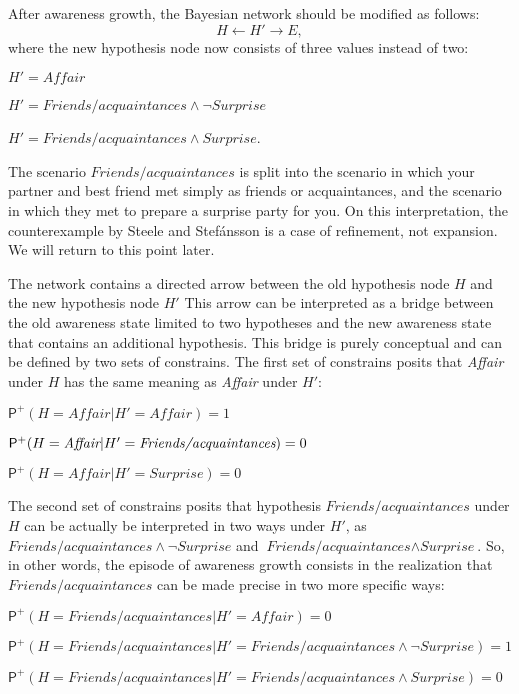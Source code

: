 \documentclass[
  11pt,
  dvipsnames,enabledeprecatedfontcommands]{scrartcl}
\newcommand{\ppr}[2]{\ensuremath{\mathsf{P}^{#1}(#2)}}
\begin{document}
After awareness growth, the Bayesian network should be modified as
follows: \[H \leftarrow H' \rightarrow E,\] where the new hypothesis
node now consists of three values instead of two:

\(H'=\textit{Affair}\)

\(H'=\textit{Friends/acquaintances}\wedge \neg \textit{Surprise}\)

\(H'=\textit{Friends/acquaintances}\wedge\textit{Surprise}\).

\noindent The scenario \(\textit{Friends/acquaintances}\) is split into
the scenario in which your partner and best friend met simply as friends
or acquaintances, and the scenario in which they met to prepare a
surprise party for you. On this interpretation, the counterexample by
Steele and Stefánsson is a case of refinement, not expansion. We will
return to this point later.

The network contains a directed arrow between the old hypothesis node
\(H\) and the new hypothesis node \(H'\) This arrow can be interpreted
as a bridge between the old awareness state limited to two hypotheses
and the new awareness state that contains an additional hypothesis. This
bridge is purely conceptual and can be defined by two sets of
constrains. The first set of constrains posits that \textit{Affair}
under \(H\) has the same meaning as \textit{Affair} under \(H'\):

\(\ppr{+}{H=\textit{Affair} \vert H'=\textit{Affair}}=1\)

\(\ppr{+}{H=\textit{Affair} \vert H'=\textit{\textit{Friends/acquaintances}}}=0\)

\(\ppr{+}{H=\textit{Affair} \vert H'=\textit{Surprise}}=0\)

The second set of constrains posits that hypothesis
\(\textit{Friends/acquaintances}\) under \(H\) can be actually be
interpreted in two ways under \(H'\), as
\(\textit{Friends/acquaintances} \wedge \neg \textit{Surprise}\) and
\(\textit{Friends/acquaintances} \wedge \textit{Surprise}\). So, in
other words, the episode of awareness growth consists in the realization
that \(\textit{Friends/acquaintances}\) can be made precise in two more
specific ways:

\(\ppr{+}{H=\textit{Friends/acquaintances} \vert H'=\textit{Affair}}=0\)

\(\ppr{+}{H=\textit{Friends/acquaintances} \vert H'=\textit{Friends/acquaintances} \wedge \neg \textit{Surprise}}=1\)

\(\ppr{+}{H=\textit{Friends/acquaintances} \vert H'=\textit{Friends/acquaintances} \wedge \textit{Surprise}}=0\)
\end{document}
